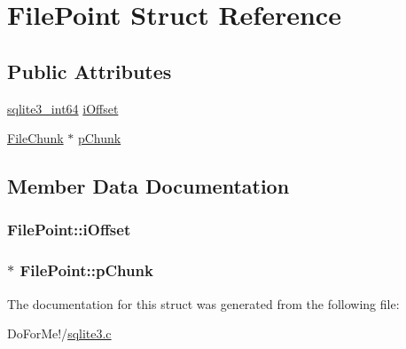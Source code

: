 \hypertarget{struct_file_point}{\section{File\-Point Struct Reference}
\label{struct_file_point}
}
\subsection*{Public Attributes}
\begin{DoxyCompactItemize}
\item 
\hyperlink{sqlite3_8c_a0a4d3e6c1ad46f90e746b920ab6ca0d2}{sqlite3\-\_\-int64} \hyperlink{struct_file_point_a00a345e479cd37ebeb9e6ed475eb4112}{i\-Offset}
\item 
\hyperlink{struct_file_chunk}{File\-Chunk} $\ast$ \hyperlink{struct_file_point_aa17216d9d2559f14a00a2c72a8959298}{p\-Chunk}
\end{DoxyCompactItemize}


\subsection{Member Data Documentation}
\hypertarget{struct_file_point_a00a345e479cd37ebeb9e6ed475eb4112}{
\subsubsection[{i\-Offset}]{ File\-Point\-::i\-Offset}}\label{struct_file_point_a00a345e479cd37ebeb9e6ed475eb4112}
\hypertarget{struct_file_point_aa17216d9d2559f14a00a2c72a8959298}{
\subsubsection[{p\-Chunk}]{$\ast$ File\-Point\-::p\-Chunk}}\label{struct_file_point_aa17216d9d2559f14a00a2c72a8959298}


The documentation for this struct was generated from the following file\-:\begin{DoxyCompactItemize}
\item 
Do\-For\-Me!/\hyperlink{sqlite3_8c}{sqlite3.\-c}\end{DoxyCompactItemize}
